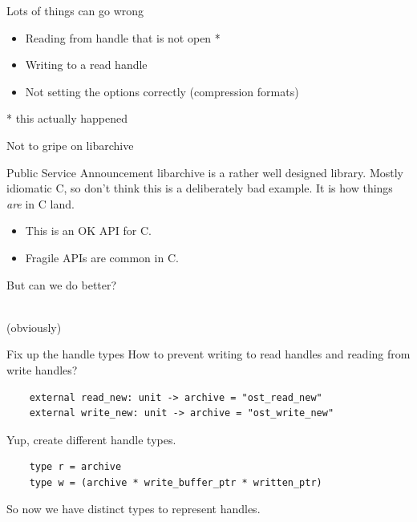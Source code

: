 \documentclass{beamer}
\renewcommand{\example}[1]{{\usebeamercolor[fg]{example text} #1}}
\begin{document}
\begin{frame}{Lots of things can go wrong}
  \begin{itemize}
    \item Reading from handle that is not open *
    \item Writing to a read handle
    \item Not setting the options correctly (compression formats)
  \end{itemize}
  \pause
  * this actually happened
\end{frame}

\begin{frame}{Not to gripe on libarchive}
  \begin{exampleblock}{Public Service Announcement}
    libarchive is a rather well designed library. Mostly idiomatic C, so don't
    think this is a deliberately bad example. It is how things \emph{are} in C
    land.
  \end{exampleblock}

  \begin{itemize}
    \item This is an OK API for C.
    \item Fragile APIs are common in C.
  \end{itemize}

  \vspace{2ex}
  \pause
  \begin{center}
    {\Large But can we do better?}
  \end{center}
\end{frame}

\begin{frame}
  \begin{center}
    {\fontsize{56pt}{54pt}\selectfont \example{Yes}}\\
    \pause
    {\scriptsize (obviously)}
  \end{center}
\end{frame}

\begin{frame}[fragile]{Fix up the handle types}
  How to prevent writing to read handles and reading from write handles?
  \begin{verbatim}
    external read_new: unit -> archive = "ost_read_new"
    external write_new: unit -> archive = "ost_write_new"
  \end{verbatim}
  \pause
  Yup, create different handle types.
  \begin{verbatim}
    type r = archive
    type w = (archive * write_buffer_ptr * written_ptr)
  \end{verbatim}
  So now we have distinct types to represent handles.
\end{frame}
\end{document}

